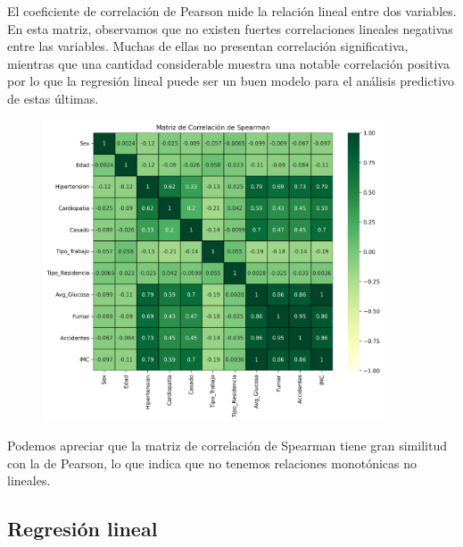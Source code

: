 \documentclass[a4paper, 12pt]{article}
\begin{document}
El coeficiente de correlación de Pearson mide la relación lineal entre dos variables. En esta matriz, 
observamos que no existen fuertes correlaciones lineales negativas entre las variables. Muchas de ellas 
no presentan correlación significativa, mientras que una cantidad considerable muestra una notable 
correlación positiva por lo que la regresión lineal puede ser un buen modelo para el análisis predictivo de estas últimas.

\begin{figure}[h]
    \centering
    \includegraphics[width=0.9\textwidth]{img/matriz_correlacion_spearman.png}
\end{figure}

Podemos apreciar que la matriz de correlación de Spearman tiene gran similitud con la de Pearson, lo que indica que no tenemos relaciones monotónicas no lineales.


\subsection{Regresión lineal}
\end{document}
